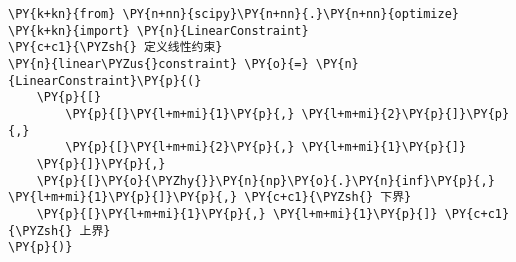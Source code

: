     \begin{tcolorbox}[breakable, size=fbox, boxrule=1pt, pad at break*=1mm,colback=cellbackground, colframe=cellborder]
\begin{Verbatim}[commandchars=\\\{\}]
\PY{k+kn}{from} \PY{n+nn}{scipy}\PY{n+nn}{.}\PY{n+nn}{optimize} \PY{k+kn}{import} \PY{n}{LinearConstraint}
\PY{c+c1}{\PYZsh{} 定义线性约束}
\PY{n}{linear\PYZus{}constraint} \PY{o}{=} \PY{n}{LinearConstraint}\PY{p}{(}
    \PY{p}{[}
        \PY{p}{[}\PY{l+m+mi}{1}\PY{p}{,} \PY{l+m+mi}{2}\PY{p}{]}\PY{p}{,} 
        \PY{p}{[}\PY{l+m+mi}{2}\PY{p}{,} \PY{l+m+mi}{1}\PY{p}{]}
    \PY{p}{]}\PY{p}{,} 
    \PY{p}{[}\PY{o}{\PYZhy{}}\PY{n}{np}\PY{o}{.}\PY{n}{inf}\PY{p}{,} \PY{l+m+mi}{1}\PY{p}{]}\PY{p}{,} \PY{c+c1}{\PYZsh{} 下界}
    \PY{p}{[}\PY{l+m+mi}{1}\PY{p}{,} \PY{l+m+mi}{1}\PY{p}{]} \PY{c+c1}{\PYZsh{} 上界}
\PY{p}{)}
\end{Verbatim}
\end{tcolorbox}

